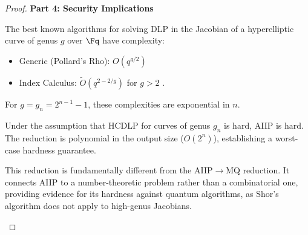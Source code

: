 \begin{proof}
            \textbf{Part 4: Security Implications}
                \begin{lemma}\label{lemma:hcdlp-hard}
                    The best known algorithms for solving DLP in the Jacobian of a hyperelliptic curve of genus \(g\) over \(\Fq\) have complexity:
                    \begin{itemize}
                        \item Generic (Pollard's Rho): \(O(q^{g/2})\)
                        \item Index Calculus: \(\tilde{O}(q^{2 - 2/g})\) for \(g > 2\) \cite{Enge2009}.
                    \end{itemize}
                    For \(g = g_n = 2^{n-1} - 1\), these complexities are exponential in \(n\).
                \end{lemma}
                Under the assumption that HCDLP for curves of genus \(g_n\) is hard, AIIP is hard. The reduction is polynomial in the output size (\(O(2^n)\)), establishing a worst-case hardness guarantee.
                \begin{remark}
                This reduction is fundamentally different from the AIIP\(\to\)MQ reduction. It connects AIIP to a number-theoretic problem rather than a combinatorial one, providing evidence for its hardness against quantum algorithms, as Shor's algorithm does not apply to high-genus Jacobians.
            \end{remark}
        \end{proof}

